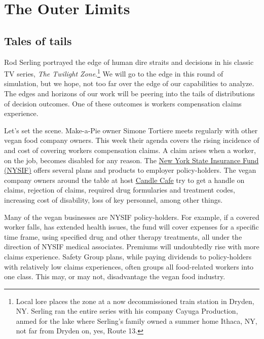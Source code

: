 \documentclass[
]{book}
\begin{document}
\hypertarget{the-outer-limits}{%
\chapter{The Outer Limits}\label{the-outer-limits}}

\hypertarget{tales-of-tails}{%
\section{Tales of tails}\label{tales-of-tails}}

Rod Serling portrayed the edge of human dire straits and decisions in his classic TV series, \emph{The Twilight Zone}.\footnote{Local lore places the zone at a now decommissioned train station in Dryden, NY. Serling ran the entire series with his company Cayuga Production, anmed for the lake where Serling's family owned a summer home Ithaca, NY, not far from Dryden on, yes, Route 13.} We will go to the edge in this round of simulation, but we hope, not too far over the edge of our capabilities to analyze. The edges and horizons of our work will be peering into the tails of distributions of decision outcomes. One of these outcomes is workers compensation claims experience.

Let's set the scene. Make-a-Pie owner Simone Tortiere meets regularly with other vegan food company owners. This week their agenda covers the rising incidence of and cost of covering workers compensation claims. A claim arises when a worker, on the job, becomes disabled for any reason. The \href{https://ww3.nysif.com/Home/Employer/LookingForInsurance/NYSIFInsurancePlans}{New York State Insurance Fund (NYSIF)} offers several plans and products to employer policy-holders. The vegan company owners around the table at host \href{http://www.candle79.com/}{Candle Cafe} try to get a handle on claims, rejection of claims, required drug formularies and treatment codes, increasing cost of disability, loss of key personnel, among other things.

Many of the vegan businesses are NYSIF policy-holders. For example, if a covered worker falls, has extended health issues, the fund will cover expenses for a specific time frame, using specified drug and other therapy treatments, all under the direction of NYSIF medical associates. Premiums will undoubtedly rise with more claims experience. Safety Group plans, while paying dividends to policy-holders with relatively low claims experiences, often groups all food-related workers into one class. This may, or may not, disadvantage the vegan food industry.
\end{document}
